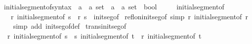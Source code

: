 \begin{isabellebody}
\ initial{\isacharunderscore}{\kern0pt}segment{\isacharunderscore}{\kern0pt}of{\isacharunderscore}{\kern0pt}syntax\ {\isacharcolon}{\kern0pt}{\isacharcolon}{\kern0pt}\ {\isachardoublequoteopen}{\isacharparenleft}{\kern0pt}{\isacharprime}{\kern0pt}a\ {\isasymtimes}\ {\isacharprime}{\kern0pt}a{\isacharparenright}{\kern0pt}\ set\ {\isasymRightarrow}\ {\isacharparenleft}{\kern0pt}{\isacharprime}{\kern0pt}a\ {\isasymtimes}\ {\isacharprime}{\kern0pt}a{\isacharparenright}{\kern0pt}\ set\ {\isasymRightarrow}\ bool{\isachardoublequoteclose}\isanewline
\ \ \ \ {\isacharparenleft}{\kern0pt}\ {\isachardoublequoteopen}initial{\isacharprime}{\kern0pt}{\isacharunderscore}{\kern0pt}segment{\isacharprime}{\kern0pt}{\isacharunderscore}{\kern0pt}of{\isachardoublequoteclose}\ {}{}{\isacharparenright}{\kern0pt}\isanewline
\ \ \ {\isachardoublequoteopen}r\ initial{\isacharunderscore}{\kern0pt}segment{\isacharunderscore}{\kern0pt}of\ s\ {\isasymequiv}\ {\isacharparenleft}{\kern0pt}r{\isacharcomma}{\kern0pt}\ s{\isacharparenright}{\kern0pt}\ {\isasymin}\ init{\isacharunderscore}{\kern0pt}seg{\isacharunderscore}{\kern0pt}of{\isachardoublequoteclose}\isanewline
\isanewline
{}\isamarkupfalse%
\ refl{\isacharunderscore}{\kern0pt}on{\isacharunderscore}{\kern0pt}init{\isacharunderscore}{\kern0pt}seg{\isacharunderscore}{\kern0pt}of\ {\isacharbrackleft}{\kern0pt}simp{\isacharbrackright}{\kern0pt}{\isacharcolon}{\kern0pt}\ {\isachardoublequoteopen}r\ initial{\isacharunderscore}{\kern0pt}segment{\isacharunderscore}{\kern0pt}of\ r{\isachardoublequoteclose}\isanewline
%
\isadelimproof
\ \ %
\endisadelimproof
%
\isatagproof
{}\isamarkupfalse%
\ {\isacharparenleft}{\kern0pt}simp\ add{\isacharcolon}{\kern0pt}\ init{\isacharunderscore}{\kern0pt}seg{\isacharunderscore}{\kern0pt}of{\isacharunderscore}{\kern0pt}def{\isacharparenright}{\kern0pt}%
\endisatagproof
{\isafoldproof}%
%
\isadelimproof
\isanewline
%
\endisadelimproof
\isanewline
{}\isamarkupfalse%
\ trans{\isacharunderscore}{\kern0pt}init{\isacharunderscore}{\kern0pt}seg{\isacharunderscore}{\kern0pt}of{\isacharcolon}{\kern0pt}\isanewline
\ \ {\isachardoublequoteopen}r\ initial{\isacharunderscore}{\kern0pt}segment{\isacharunderscore}{\kern0pt}of\ s\ {\isasymLongrightarrow}\ s\ initial{\isacharunderscore}{\kern0pt}segment{\isacharunderscore}{\kern0pt}of\ t\ {\isasymLongrightarrow}\ r\ initial{\isacharunderscore}{\kern0pt}segment{\isacharunderscore}{\kern0pt}of\ t{\isachardoublequoteclose}\isanewline
%
\isadelimproof
\ \ %
\endisadelimproof

\end{isabellebody}
